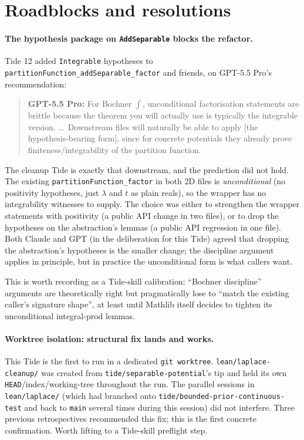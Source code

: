 \documentclass[11pt]{article}
\newcommand{\gptbox}[1]{\par\medskip\begin{quote}\small\textbf{\textcolor{green!50!black}{GPT-5.5 Pro:}} #1\end{quote}\medskip}
\begin{document}
\section{Roadblocks and resolutions}

\paragraph{The hypothesis package on \texttt{AddSeparable} blocks the
refactor.}
Tide 12 added \texttt{Integrable} hypotheses to
\texttt{partitionFunction\_addSeparable\_factor} and friends, on
GPT-5.5 Pro's recommendation:

\gptbox{For Bochner $\int$, unconditional factorisation statements are
brittle because the theorem you will actually use is typically the
integrable version. \ldots~Downstream files will naturally be able to
apply [the hypothesis-bearing form], since for concrete potentials
they already prove finiteness/integrability of the partition function.}

The cleanup Tide is exactly that downstream, and the prediction did
not hold. The existing \texttt{partitionFunction\_factor} in both 2D
files is \emph{unconditional} (no positivity hypotheses, just $\lambda$
and $t$ as plain reals), so the wrapper has no integrability witnesses
to supply. The choice was either to strengthen the wrapper statements
with positivity (a public API change in two files), or to drop the
hypotheses on the abstraction's lemmas (a public API regression in
one file). Both Claude and GPT (in the deliberation for this Tide)
agreed that dropping the abstraction's hypotheses is the smaller
change; the discipline argument applies in principle, but in practice
the unconditional form is what callers want.

This is worth recording as a Tide-skill calibration: ``Bochner
discipline'' arguments are theoretically right but pragmatically lose
to ``match the existing caller's signature shape'', at least until
Mathlib itself decides to tighten its unconditional integral-prod
lemmas.

\paragraph{Worktree isolation: structural fix lands and works.}
This Tide is the first to run in a dedicated \texttt{git worktree}.
\texttt{lean/laplace-cleanup/} was created from
\texttt{tide/separable-potential}'s tip and held its own
\texttt{HEAD}/index/working-tree throughout the run. The parallel
sessions in \texttt{lean/laplace/} (which had branched onto
\texttt{tide/bounded-prior-continuous-test} and back to \texttt{main}
several times during this session) did not interfere. Three previous
retrospectives recommended this fix; this is the first concrete
confirmation. Worth lifting to a Tide-skill preflight step.
\end{document}
